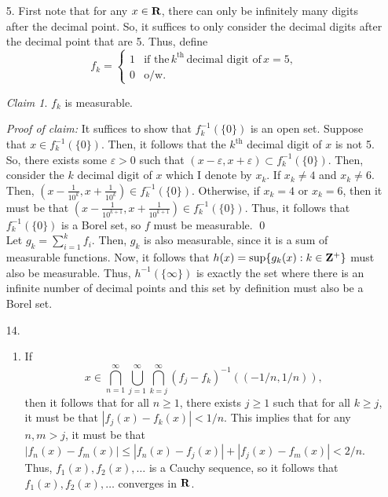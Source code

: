 \documentclass{article}
\newcommand{\eps}{\varepsilon}
\theoremstyle{remark}
\newtheorem{claim}{Claim}
\newenvironment{poc}{\textit{Proof of claim:}}{\qed\\}
\begin{document}
\thispagestyle{firstpage}
\begin{enumerate}[leftmargin=*]
    \item[5.] First note that for any $x\in \mathbf{R}$, there can only be infinitely many digits after the decimal point. 
    So, it suffices to only consider the decimal digits after the decimal point that are 5. Thus, define 
    \begin{equation*}
        f_k = \begin{cases}1 &\text{if the}\,k^{\text{th}}\,\text{decimal digit of}\, x=5, \\ 0&\text{o/w.}\end{cases}
    \end{equation*}
    \begin{claim}
        $f_k$ is measurable.
    \end{claim}
    \begin{poc}
       It suffices to show that $f_k^{-1}(\{0\})$ is an open set. Suppose that $x \in f_k^{-1}(\{0\})$. Then, it follows that the $k^{\text{th}}$ decimal digit of $x$ is not 5. So, there exists some $\eps > 0$ such that $(x-\eps, x+\eps) \subset f_k^{-1}(\{0\})$.
       Then, consider the $k$ decimal digit of $x$ which I denote by $x_k$. If $x_k \neq 4$ and $x_k \neq 6$. Then, 
       $(x - \frac{1}{10^k}, x+\frac{1}{10^k}) \in f_k^{-1}(\{0\})$. Otherwise, if $x_k = 4$ or $x_k = 6$, then it must be that  
       $(x - \frac{1}{10^{k+1}}, x + \frac{1}{10^{k+1}}) \in f_k^{-1}(\{0\})$. Thus, it follows that 
       $f_k^{-1}(\{0\})$ is a Borel set, so $f$ must be measurable. 
    \end{poc}
    Let $g_k = \sum_{i=1}^k f_i$. Then, $g_k$ is also measurable, since it is a sum of measurable functions. Now, it follows
    that $h(x) = \sup\{g_k(x): k\in\mathbf{Z}^+\}$ must also be measurable. Thus, $h^{-1}(\{\infty\})$ is exactly the set 
    where there is an infinite number of decimal points and this set by definition must also be a Borel set.
    \item[14.] \begin{enumerate}[label=(\alph*)]
        \item If 
        \[
            x \in \bigcap_{n=1}^\infty \bigcup_{j=1}^\infty \bigcap_{k=j}^\infty (f_j - f_k)^{-1}((-1/n, 1/n)),
        \]
        then it follows that for all $n \geq 1$, there exists $j \geq 1$ such
        that for all $k \geq j$, it must be that $|f_j(x) - f_k(x)| < 1/n$. This
        implies that for any $n,m > j$, it must be that $|f_n(x) - f_m(x)| \leq
        |f_n(x) - f_j(x)| + |f_j(x) - f_m(x)| < 2/n$. Thus, $f_1(x), f_2(x),
        \ldots$ is a Cauchy sequence, so it follows that $f_1(x), f_2(x),
        \ldots$ converges in $\mathbf{R}$.
    

\end{enumerate}
\end{enumerate}
\end{document}
